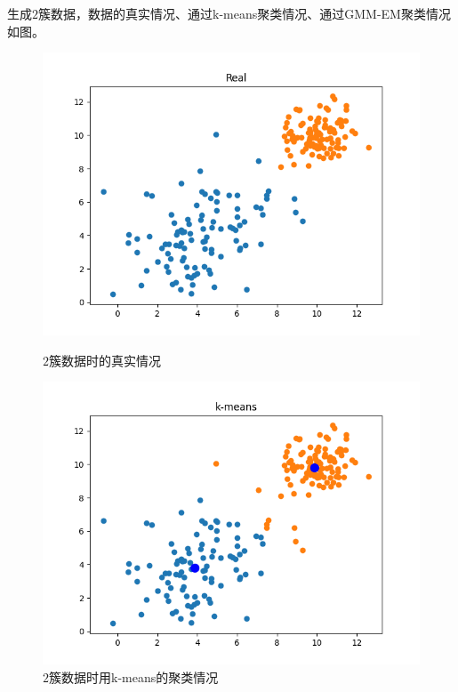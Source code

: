 生成$2$簇数据，数据的真实情况、通过k-means聚类情况、通过GMM-EM聚类情况如图。

\begin{figure}[htbp]
    \begin{minipage}[t]{0.3\linewidth}
        \centering
        \includegraphics[width=\textwidth]{figures/Figure_7.png}
        \caption{$2$簇数据时的真实情况}
    \end{minipage}
    \begin{minipage}[t]{0.3\linewidth}
        \centering
        \includegraphics[width=\textwidth]{figures/Figure_8.png}
        \caption{$2$簇数据时用k-means的聚类情况}
    \end{minipage}
    \begin{minipage}[t]{0.3\linewidth}

\end{minipage}
\end{figure}

